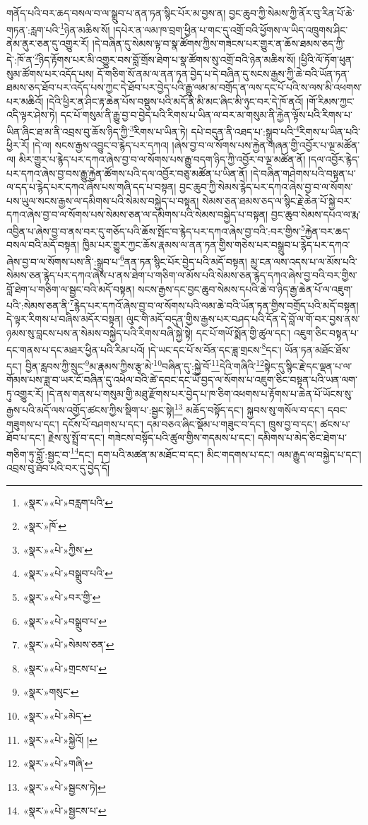 གནོད་པའི་བར་ཆད་བསལ་བ་ལ་སྒྲུབ་པ་ནན་ཏན་སྙིང་པོར་མ་བྱས་ན། བྱང་ཆུབ་ཀྱི་སེམས་ཀྱི་ནོར་བུ་རིན་པོ་ཆེ་གཏན་:རླག་པའི་\footnote{«སྣར་»«པེ་»བརླག་པའི་}ཉེན་མཆིས་སོ། །དཔེར་ན་ལམ་ཁ་བྲག་ཕྱིན་པ་གང་དུ་འགྲོ་བའི་ཕྱོགས་ལ་ཡིད་འཁྲུགས་ཤིང་ནེམ་ནུར་ཅན་དུ་འགྱུར་རོ། །དེ་བཞིན་དུ་སེམས་ལྟ་བ་སྣ་ཚོགས་ཀྱིས་གཟེངས་པར་གྱུར་ན་ཆོས་ཐམས་ཅད་ཀྱི་དེ་:ཁོ་ན་\footnote{«སྣར་»ཁོ་}ཉིད་རྟོགས་པར་མི་འགྱུར་བས་བློ་གྲོས་ཐེག་པ་སྣ་ཚོགས་སུ་འགྲོ་བའི་ཉེན་མཆིས་སོ། །ཕྱིའི་ལོ་ཏོག་ཕུན་སུམ་ཚོགས་པར་འདོད་པས། དོ་གཅིག་སོ་ནམ་ལ་ནན་ཏན་བྱེད་པ་དེ་བཞིན་དུ་སངས་རྒྱས་ཀྱི་ཆེ་བའི་ཡོན་ཏན་ཐམས་ཅད་ཐོབ་པར་འདོད་པས་ཀྱང་དེ་ཐོབ་པར་བྱེད་པའི་རྒྱུ་ལམ་མ་བགྲོད་ན་ལས་དང་པོ་པའི་ས་ལས་མི་འཕགས་པར་མཆིའོ། །དེའི་ཕྱིར་ན་ཤིང་རྟ་ཆེན་པོས་བསྡུས་པའི་མདོ་ནི་མི་མང་ཞིང་མི་ཉུང་བར་དེ་ཁོ་ནའོ། །གོ་རིམས་ཀྱང་འདི་ལྟར་ཤེས་ཏེ། དང་པོ་གསུམ་ནི་རྒྱུ་བྱ་བ་བྱེད་པའི་རིགས་པ་ཡིན་ལ་བར་མ་གསུམ་ནི་རྐྱེན་ལྟོས་པའི་རིགས་པ་ཡིན་ཞིང་ཐ་མ་ནི་འབྲས་བུ་ཆོས་ཉིད་ཀྱི་\footnote{«སྣར་»«པེ་»ཀྱིས་}རིགས་པ་ཡིན་ཏེ། དཔེ་བདུན་ནི་འཐད་པ་:སྒྲུབ་པའི་\footnote{«སྣར་»«པེ་»བསྒྲུབ་པའི་}རིགས་པ་ཡིན་པའི་ཕྱིར་རོ། །དེ་ལ། སངས་རྒྱས་འབྱུང་བ་རྙེད་པར་དཀའ། །ཞེས་བྱ་བ་ལ་སོགས་པས་རྐྱེན་གཞན་གྱི་འབྱོར་པ་ལྔ་མཚོན་ལ། མིར་གྱུར་པ་རྙེད་པར་དཀའ་ཞེས་བྱ་བ་ལ་སོགས་པས་རྒྱུ་བདག་ཉིད་ཀྱི་འབྱོར་བ་ལྔ་མཚོན་ནོ། །དལ་འབྱོར་རྙེད་པར་དཀའ་ཞེས་བྱ་བས་རྒྱུ་རྐྱེན་ཚོགས་པའི་དལ་འབྱོར་བཅུ་མཚོན་པ་ཡིན་ནོ། །དེ་བཞིན་གཤེགས་པའི་བསྟན་པ་ལ་དད་པ་རྙེད་པར་དཀའ་ཞེས་པས་གཞི་དད་པ་བསྟན། བྱང་ཆུབ་ཀྱི་སེམས་རྙེད་པར་དཀའ་ཞེས་བྱ་བ་ལ་སོགས་པས་ཡུལ་སངས་རྒྱས་ལ་དམིགས་པའི་སེམས་བསྐྱེད་པ་བསྟན། སེམས་ཅན་ཐམས་ཅད་ལ་སྙིང་རྗེ་ཆེན་པོ་སྐྱེ་བར་དཀའ་ཞེས་བྱ་བ་ལ་སོགས་པས་སེམས་ཅན་ལ་དམིགས་པའི་སེམས་བསྐྱེད་པ་བསྟན། བྱང་ཆུབ་སེམས་དཔའ་ལ་རྨ་འབྱིན་པ་ཞེས་བྱ་བ་ནས་བར་དུ་གཅོད་པའི་ཆོས་སྤོང་བ་རྙེད་པར་དཀའ་ཞེས་བྱ་བའི་:བར་གྱིས་\footnote{«སྣར་»«པེ་»བར་གྱི་}རྐྱེན་བར་ཆད་བསལ་བའི་མདོ་བསྟན། ཁྱིམ་པར་གྱུར་ཀྱང་ཆོས་རྣམས་ལ་ནན་ཏན་གྱིས་གཅེས་པར་བསྒྲུབ་པ་རྙེད་པར་དཀའ་ཞེས་བྱ་བ་ལ་སོགས་པས་ནི་:སྒྲུབ་པ་\footnote{«སྣར་»«པེ་»བསྒྲུབ་པ་}ནན་ཏན་སྙིང་པོར་བྱེད་པའི་མདོ་བསྟན། མྱ་ངན་ལས་འདས་པ་ལ་མོས་པའི་སེམས་ཅན་རྙེད་པར་དཀའ་ཞེས་པ་ནས་ཐེག་པ་གཅིག་ལ་མོས་པའི་སེམས་ཅན་རྙེད་དཀའ་ཞེས་བྱ་བའི་བར་གྱིས་བློ་ཐེག་པ་གཅིག་ལ་སྦྱང་བའི་མདོ་བསྟན། སངས་རྒྱས་དང་བྱང་ཆུབ་སེམས་དཔའི་ཆེ་བ་ཉིད་རྒྱ་ཆེན་པོ་ལ་འཇུག་པའི་:སེམས་ཅན་ནི་\footnote{«སྣར་»«པེ་»སེམས་ཅན་}རྙེད་པར་དཀའོ་ཞེས་བྱ་བ་ལ་སོགས་པའི་ལམ་ཆེ་བའི་ཡོན་ཏན་གྱིས་བགྲོད་པའི་མདོ་བསྟན། དེ་ལྟར་རིགས་པ་བཞིས་མདོར་བསྟན། ལུང་གི་མདོ་བདུན་གྱིས་རྒྱས་པར་བཤད་པའི་དོན་དེ་བློ་ལ་གོ་བར་བྱས་ནས་ཉམས་སུ་བླངས་པས་ན་སེམས་བསྐྱེད་པའི་རིགས་བཞི་སྐྱེ་སྟེ། དང་པོ་གཡོ་སྨོན་གྱི་ཚུལ་དང་། འཇུག་ཅིང་བསྟན་པ་དང་གནས་པ་དང་མཐར་ཕྱིན་པའི་རིམ་པའོ། །དེ་ཡང་དང་པོ་ས་བོན་དང་ཟླ་གྲངས་\footnote{«སྣར་»«པེ་»གྲངས་པ་}དང་། ཡོན་ཏན་མཐོང་ཐོས་དང་། བྱིན་རླབས་ཀྱི་སྲུང་\footnote{«སྣར་»གསུང་}མ་རྣམས་ཀྱིས་རྩྭ་མེ་\footnote{«སྣར་»«པེ་»མེད་}བཞིན་དུ་:སྐྱེ་བོ་\footnote{«སྣར་»«པེ་»སྐྱེའོ། །}དེའི་གཞིའི་\footnote{«སྣར་»«པེ་»གཞི་}སྟེང་དུ་སྙིང་རྗེ་དང་ལྡན་པ་ལ་གོམས་པས་ཟླ་བ་ཡར་ངོ་བཞིན་དུ་འཕེལ་བའི་ཚེ་དབང་དང་ཡོ་བྱད་ལ་སོགས་པ་འཇུག་ཅིང་བསྟན་པའི་ཡན་ལག་ཏུ་འགྱུར་རོ། །དེ་ནས་གནས་པ་གསུམ་གྱི་མཐུ་རྫོགས་པར་བྱེད་པ་ཁ་ཅིག་འཕགས་པ་རྟོགས་པ་ཆེན་པོ་ཡོངས་སུ་རྒྱས་པའི་མདོ་ལས་འགྱོད་ཚངས་ཀྱིས་སྡིག་པ་:སྦྱང་སྟེ།\footnote{«སྣར་»«པེ་»སྦྱངས་ཏེ།} མཆོད་བསྟོད་དང་། སྐྱབས་སུ་གསོལ་བ་དང་། དབང་གཟུགས་པ་དང་། དངོས་པོ་བཤགས་པ་དང་། དམ་བཅའ་ཞིང་སྡོམ་པ་གཟུང་བ་དང་། ཁྲུས་བྱ་བ་དང་། ཚངས་པ་ཐོབ་པ་དང་། རྗེས་སུ་སྤྲོ་བ་དང་། གཟེངས་བསྟོད་པའི་ཚུལ་གྱིས་གདམས་པ་དང་། དམིགས་པ་མེད་ཅིང་ཐེག་པ་གཅིག་ཏུ་བློ་:སྦྱང་བ་\footnote{«སྣར་»«པེ་»སྦྱངས་པ་}དང་། དག་པའི་མཚན་མ་མཐོང་བ་དང་། མིང་གདགས་པ་དང་། ལམ་རྒྱུད་ལ་བསྐྱེད་པ་དང་། འབྲས་བུ་ཐོབ་པའི་བར་དུ་བྱེད་དོ། 